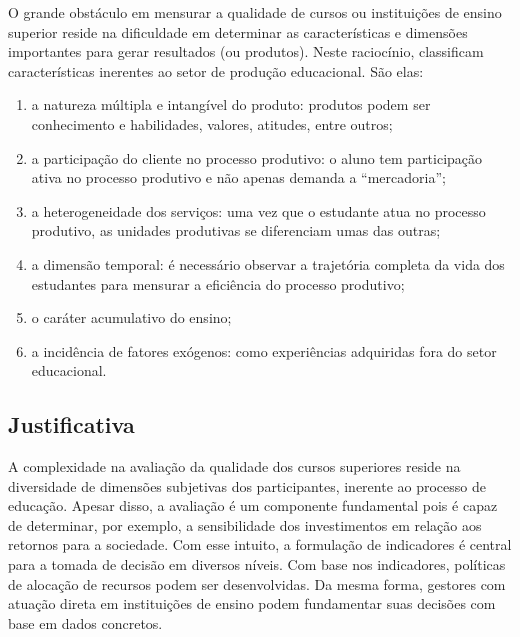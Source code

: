 
O grande obstáculo em mensurar a qualidade de cursos ou instituições de ensino superior reside na dificuldade em determinar as características e dimensões importantes para gerar resultados (ou produtos). Neste raciocínio,  classificam características inerentes ao setor de produção educacional. São elas: 
\begin{enumerate}[label=\roman*)]
	\item a natureza múltipla e intangível do produto: produtos podem ser conhecimento e habilidades, valores, atitudes, entre outros;
	\item a participação do cliente no processo produtivo: o aluno tem participação ativa no processo produtivo e não apenas demanda a ``mercadoria'';
	\item a heterogeneidade dos serviços: uma vez que o estudante atua no processo produtivo, as unidades produtivas se diferenciam umas das outras;
	\item a dimensão temporal: é necessário observar a trajetória completa da vida dos estudantes para mensurar a eficiência do processo produtivo;
	\item o caráter acumulativo do ensino;
	\item a incidência de fatores exógenos: como experiências adquiridas fora do setor educacional.
\end{enumerate}

\subsection{Justificativa}

A complexidade na avaliação da qualidade dos cursos superiores reside na diversidade de dimensões subjetivas dos participantes, inerente ao processo de educação. Apesar disso, a avaliação é um componente fundamental pois é capaz de determinar, por exemplo, a sensibilidade dos investimentos em relação aos retornos para a sociedade. Com esse intuito, a formulação de indicadores é central para a tomada de decisão em diversos níveis. Com base nos indicadores, políticas de alocação de recursos podem ser desenvolvidas. Da mesma forma, gestores com atuação direta em instituições de ensino podem fundamentar suas decisões com base em dados concretos.


